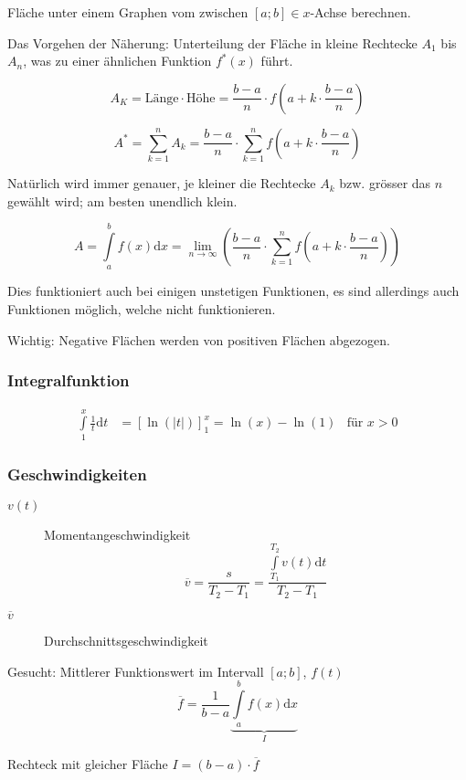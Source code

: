 Fläche unter einem Graphen vom zwischen $[a;b] \in x$-Achse berechnen.

Das Vorgehen der Näherung: Unterteilung der Fläche in kleine Rechtecke $A_1$ bis $A_n$, was zu einer ähnlichen Funktion $f^\ast(x)$ führt.


\[
A_K = \text{Länge} \cdot \text{Höhe} = \frac{b-a}{n} \cdot f\left(a + k \cdot \frac{b-a}{n}\right)
\]

\[
A^\ast = \sum^n_{k=1}{A_k} = \frac{b-a}{n} \cdot \sum^n_{k=1}{ f\left(a + k \cdot \frac{b-a}{n}\right)}
\]

Natürlich wird immer genauer, je kleiner die Rechtecke $A_k$ bzw. grösser das $n$ gewählt wird; am besten unendlich klein.

\[
A = \int\limits^b_a{f(x) \mathrm{d}x} = \lim_{n \to \infty} \left( \frac{b-a}{n} \cdot \sum^n_{k=1}{ f\left(a + k \cdot \frac{b-a}{n}\right)} \right)
\]

Dies funktioniert auch bei einigen unstetigen Funktionen, es sind allerdings auch Funktionen möglich, welche nicht funktionieren.

Wichtig: Negative Flächen werden von positiven Flächen abgezogen.

\subsubsection{Integralfunktion}

\begin{align*}
	\int\limits^{x}_{1} \frac{1}{t} \mathrm{d}t &= \left[ \ln(|t|) \right]^x_1 = \ln(x) - \ln(1) & \text{für } x > 0
\end{align*}

\subsubsection{Geschwindigkeiten}

\begin{description}
	\item[$v(t)$] Momentangeschwindigkeit 
	\[
		\overline{v} = \frac{s}{T_2- T_1} = \frac{\int\limits^{T_2}_{T_1}{v(t)\mathrm{d}t}}{T_2 - T_1}
	\]
	\item[$\overline{v}$] Durchschnittsgeschwindigkeit
\end{description}

Gesucht: Mittlerer Funktionswert im Intervall $[a;b]$, $f(t)$
\[
	\overline{f} = \frac{1}{b-a} \underbrace{\int\limits^b_a{f(x)\mathrm{d}x}}_I
\]

Rechteck mit gleicher Fläche $I = (b-a) \cdot \overline{f}$

